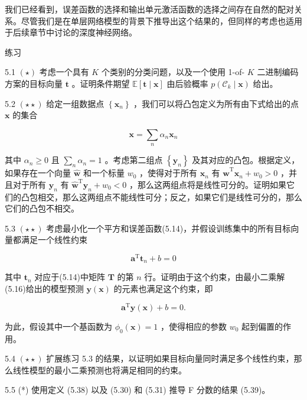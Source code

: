 \documentclass[10pt]{article}
\begin{document}
我们已经看到，误差函数的选择和输出单元激活函数的选择之间存在自然的配对关系。尽管我们是在单层网络模型的背景下推导出这个结果的，但同样的考虑也适用于后续章节中讨论的深度神经网络。

练习

5.1 \(\left( \star \right)\) 考虑一个具有 \(K\) 个类别的分类问题，以及一个使用 1-of- \(K\) 二进制编码方案的目标向量 \(\mathbf{t}\) 。证明条件期望 \(\mathbb{E}\left\lbrack  {\mathbf{t} \mid  \mathbf{x}}\right\rbrack\) 由后验概率 \(p\left( {{\mathcal{C}}_{k} \mid  \mathbf{x}}\right)\) 给出。

5.2 \(\left( {\star  \star  }\right)\) 给定一组数据点 \(\left\{  {\mathbf{x}}_{n}\right\}\) ，我们可以将凸包定义为所有由下式给出的点 \(\mathbf{x}\) 的集合

\[
\mathbf{x} = \mathop{\sum }\limits_{n}{\alpha }_{n}{\mathbf{x}}_{n} \tag{5.96}
\]

其中 \({\alpha }_{n} \geq  0\) 且 \(\mathop{\sum }\limits_{n}{\alpha }_{n} = 1\) 。考虑第二组点 \(\left\{  {\mathbf{y}}_{n}\right\}\) 及其对应的凸包。根据定义，如果存在一个向量 \(\widehat{\mathbf{w}}\) 和一个标量 \({w}_{0}\) ，使得对于所有 \({\mathbf{x}}_{n}\) 有 \({\widehat{\mathbf{w}}}^{\mathrm{T}}{\mathbf{x}}_{n} + {w}_{0} > 0\) ，并且对于所有 \({\mathbf{y}}_{n}\) 有 \({\widehat{\mathbf{w}}}^{\mathrm{T}}{\mathbf{y}}_{n} + {w}_{0} < 0\) ，那么这两组点将是线性可分的。证明如果它们的凸包相交，那么这两组点不能线性可分；反之，如果它们是线性可分的，那么它们的凸包不相交。

5.3 \(\left( {\star  \star  }\right)\) 考虑最小化一个平方和误差函数(5.14)，并假设训练集中的所有目标向量都满足一个线性约束

\[
{\mathbf{a}}^{\mathrm{T}}{\mathbf{t}}_{n} + b = 0 \tag{5.97}
\]

其中 \({\mathbf{t}}_{n}\) 对应于(5.14)中矩阵 \(\mathbf{T}\) 的第 \(n\) 行。证明由于这个约束，由最小二乘解(5.16)给出的模型预测 \(\mathbf{y}\left( \mathbf{x}\right)\) 的元素也满足这个约束，即

\[
{\mathbf{a}}^{\mathrm{T}}\mathbf{y}\left( \mathbf{x}\right)  + b = 0. \tag{5.98}
\]

为此，假设其中一个基函数为 \({\phi }_{0}\left( \mathbf{x}\right)  = 1\) ，使得相应的参数 \({w}_{0}\) 起到偏置的作用。

5.4 \(\left( {\star  \star  }\right)\) 扩展练习 5.3 的结果，以证明如果目标向量同时满足多个线性约束，那么线性模型的最小二乘预测也将满足相同的约束。

5.5 (*) 使用定义 (5.38) 以及 (5.30) 和 (5.31) 推导 F 分数的结果 (5.39)。
\end{document}
